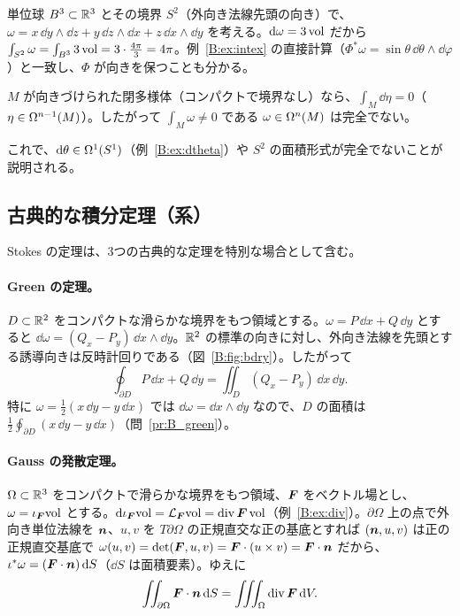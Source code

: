 \begin{ex}[$B^3$ と $S^2$]
単位球 $B^3\subset\mathbb R^3$ とその境界 $S^2$（外向き法線先頭の向き）で、$\omega=x\,\dd y\wedge\dd z+y\,\dd z\wedge\dd x+z\,\dd x\wedge\dd y$ を考える。$\mathrm{d}\omega=3\,\mathrm{vol}$ だから $\int_{S^2}\omega=\int_{B^3}3\,\mathrm{vol}=3\cdot\frac{4\pi}3=4\pi$。例~\ref{B:ex:intex} の直接計算（$\Phi^*\omega=\sin\theta\,\dd\theta\wedge\dd\varphi$）と一致し、$\Phi$ が向きを保つことも分かる。
\end{ex}

\begin{cor}[閉多様体上の完全形式]\label{B:cor:exactint}\tP
$M$ が向きづけられた閉多様体（コンパクトで境界なし）なら、$\int_M\dd\eta=0$（$\eta\in\Omega^{n-1}(M)$）。したがって $\int_M\omega\neq0$ である $\omega\in\Omega^n(M)$ は完全でない。
\end{cor}
これで、$\mathrm{d}\theta\in\Omega^1(S^1)$（例~\ref{B:ex:dtheta}）や $S^2$ の面積形式が完全でないことが説明される。

\subsection{古典的な積分定理（系）}\label{B:ss:classical}

Stokes の定理は、3つの古典的な定理を特別な場合として含む。

\paragraph{Green の定理。}$D\subset\mathbb R^2$ をコンパクトな滑らかな境界をもつ領域とする。$\omega=P\,\dd x+Q\,\dd y$ とすると $\dd\omega=(Q_x-P_y)\,\dd x\wedge\dd y$。$\mathbb R^2$ の標準の向きに対し、外向き法線を先頭とする誘導向きは反時計回りである（図~\ref{B:fig:bdry}）。したがって
\[
\oint_{\partial D}P\,\dd x+Q\,\dd y=\iint_D(Q_x-P_y)\,\dd x\,\dd y .
\]
特に $\omega=\tfrac12(x\,\dd y-y\,\dd x)$ では $\dd\omega=\dd x\wedge\dd y$ なので、$D$ の面積は $\frac12\oint_{\partial D}(x\,\dd y-y\,\dd x)$（問~\ref{pr:B_green}）。

\paragraph{Gauss の発散定理。}$\Omega\subset\mathbb R^3$ をコンパクトで滑らかな境界をもつ領域、$\boldsymbol F$ をベクトル場とし、$\omega=\iota_{\boldsymbol F}\mathrm{vol}$ とする。$\mathrm{d}\iota_{\boldsymbol F}\mathrm{vol}=\mathcal L_{\boldsymbol F}\mathrm{vol}=\operatorname{div}\boldsymbol F\,\mathrm{vol}$（例~\ref{B:ex:div}）。$\partial\Omega$ 上の点で外向き単位法線を $\boldsymbol n$、$u,v$ を $T\partial\Omega$ の正規直交な正の基底とすれば $(\boldsymbol n,u,v)$ は正の正規直交基底で $\omega(u,v)=\det(\boldsymbol F,u,v)=\boldsymbol F\cdot(u\times v)=\boldsymbol F\cdot\boldsymbol n$ だから、$\iota^*\omega=(\boldsymbol F\cdot\boldsymbol n)\,\mathrm{d} S$（$\dd S$ は面積要素）。ゆえに
\[
\iint_{\partial\Omega}\boldsymbol F\cdot\boldsymbol n\,\mathrm{d} S=\iiint_\Omega\operatorname{div}\boldsymbol F\,\mathrm{d} V .
\]

